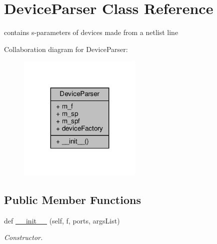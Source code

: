 \hypertarget{classSignalIntegrity_1_1Parsers_1_1Devices_1_1DeviceParser_1_1DeviceParser}{}\section{Device\+Parser Class Reference}
\label{classSignalIntegrity_1_1Parsers_1_1Devices_1_1DeviceParser_1_1DeviceParser}


contains s-\/parameters of devices made from a netlist line  




Collaboration diagram for Device\+Parser\+:
\nopagebreak
\begin{figure}[H]
\begin{center}
\leavevmode
\includegraphics[width=167pt]{classSignalIntegrity_1_1Parsers_1_1Devices_1_1DeviceParser_1_1DeviceParser__coll__graph}
\end{center}
\end{figure}
\subsection*{Public Member Functions}
\begin{DoxyCompactItemize}
\item 
def \hyperlink{classSignalIntegrity_1_1Parsers_1_1Devices_1_1DeviceParser_1_1DeviceParser_a286a7f15e5aa7761d219f91accd234c1}{\+\_\+\+\_\+init\+\_\+\+\_\+} (self, f, ports, args\+List)
\begin{DoxyCompactList}\small\item\em Constructor. \end{DoxyCompactList}\end{DoxyCompactItemize}
